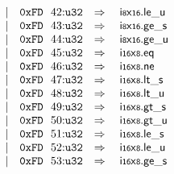 $$\begin{array}[t]{@{}lrrl@{}l@{}l@{}l@{}}
& & | & \mathtt{0xFD}~~42{:}{\mathtt{u32}} & \quad\Rightarrow\quad{} & {\mathsf{i{\scriptstyle 8}}}{\mathsf{x}}{\mathsf{{\scriptstyle 16}}} {.} {\mathsf{le}}{\mathsf{\_}}{\mathsf{u}} \\
& & | & \mathtt{0xFD}~~43{:}{\mathtt{u32}} & \quad\Rightarrow\quad{} & {\mathsf{i{\scriptstyle 8}}}{\mathsf{x}}{\mathsf{{\scriptstyle 16}}} {.} {\mathsf{ge}}{\mathsf{\_}}{\mathsf{s}} \\
& & | & \mathtt{0xFD}~~44{:}{\mathtt{u32}} & \quad\Rightarrow\quad{} & {\mathsf{i{\scriptstyle 8}}}{\mathsf{x}}{\mathsf{{\scriptstyle 16}}} {.} {\mathsf{ge}}{\mathsf{\_}}{\mathsf{u}} \\
& & | & \mathtt{0xFD}~~45{:}{\mathtt{u32}} & \quad\Rightarrow\quad{} & {\mathsf{i{\scriptstyle 16}}}{\mathsf{x}}{\mathsf{{\scriptstyle 8}}} {.} \mathsf{eq} \\
& & | & \mathtt{0xFD}~~46{:}{\mathtt{u32}} & \quad\Rightarrow\quad{} & {\mathsf{i{\scriptstyle 16}}}{\mathsf{x}}{\mathsf{{\scriptstyle 8}}} {.} \mathsf{ne} \\
& & | & \mathtt{0xFD}~~47{:}{\mathtt{u32}} & \quad\Rightarrow\quad{} & {\mathsf{i{\scriptstyle 16}}}{\mathsf{x}}{\mathsf{{\scriptstyle 8}}} {.} {\mathsf{lt}}{\mathsf{\_}}{\mathsf{s}} \\
& & | & \mathtt{0xFD}~~48{:}{\mathtt{u32}} & \quad\Rightarrow\quad{} & {\mathsf{i{\scriptstyle 16}}}{\mathsf{x}}{\mathsf{{\scriptstyle 8}}} {.} {\mathsf{lt}}{\mathsf{\_}}{\mathsf{u}} \\
& & | & \mathtt{0xFD}~~49{:}{\mathtt{u32}} & \quad\Rightarrow\quad{} & {\mathsf{i{\scriptstyle 16}}}{\mathsf{x}}{\mathsf{{\scriptstyle 8}}} {.} {\mathsf{gt}}{\mathsf{\_}}{\mathsf{s}} \\
& & | & \mathtt{0xFD}~~50{:}{\mathtt{u32}} & \quad\Rightarrow\quad{} & {\mathsf{i{\scriptstyle 16}}}{\mathsf{x}}{\mathsf{{\scriptstyle 8}}} {.} {\mathsf{gt}}{\mathsf{\_}}{\mathsf{u}} \\
& & | & \mathtt{0xFD}~~51{:}{\mathtt{u32}} & \quad\Rightarrow\quad{} & {\mathsf{i{\scriptstyle 16}}}{\mathsf{x}}{\mathsf{{\scriptstyle 8}}} {.} {\mathsf{le}}{\mathsf{\_}}{\mathsf{s}} \\
& & | & \mathtt{0xFD}~~52{:}{\mathtt{u32}} & \quad\Rightarrow\quad{} & {\mathsf{i{\scriptstyle 16}}}{\mathsf{x}}{\mathsf{{\scriptstyle 8}}} {.} {\mathsf{le}}{\mathsf{\_}}{\mathsf{u}} \\
& & | & \mathtt{0xFD}~~53{:}{\mathtt{u32}} & \quad\Rightarrow\quad{} & {\mathsf{i{\scriptstyle 16}}}{\mathsf{x}}{\mathsf{{\scriptstyle 8}}} {.} {\mathsf{ge}}{\mathsf{\_}}{\mathsf{s}} \\

\end{array}$$
